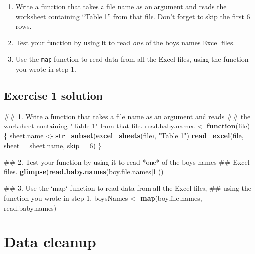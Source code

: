 \documentclass[]{book}
\newenvironment{Shaded}{\begin{snugshade}}{\end{snugshade}}
\newcommand{\KeywordTok}[1]{\textcolor[rgb]{0.13,0.29,0.53}{\textbf{#1}}}
\newcommand{\DataTypeTok}[1]{\textcolor[rgb]{0.13,0.29,0.53}{#1}}
\newcommand{\DecValTok}[1]{\textcolor[rgb]{0.00,0.00,0.81}{#1}}
\newcommand{\StringTok}[1]{\textcolor[rgb]{0.31,0.60,0.02}{#1}}
\newcommand{\ControlFlowTok}[1]{\textcolor[rgb]{0.13,0.29,0.53}{\textbf{#1}}}
\newcommand{\NormalTok}[1]{#1}
\begin{document}
\begin{enumerate}
\def\labelenumi{\arabic{enumi}.}
\item
  Write a function that takes a file name as an argument and reads the
  worksheet containing ``Table 1'' from that file. Don't forget to skip
  the first 6 rows.
\item
  Test your function by using it to read \emph{one} of the boys names
  Excel files.
\item
  Use the \texttt{map} function to read data from all the Excel files,
  using the function you wrote in step 1.
\end{enumerate}

\subsection{Exercise 1 solution}\label{exercise-1-solution-1}

\begin{Shaded}
\begin{Highlighting}[]
\NormalTok{  ## 1. Write a function that takes a file name as an argument and reads}
\NormalTok{  ##    the worksheet containing "Table 1" from that file.}
\NormalTok{  read.baby.names <-}\StringTok{ }\ControlFlowTok{function}\NormalTok{(file) \{}
\NormalTok{      sheet.name <-}\StringTok{ }\KeywordTok{str_subset}\NormalTok{(}\KeywordTok{excel_sheets}\NormalTok{(file), }\StringTok{"Table 1"}\NormalTok{)}
      \KeywordTok{read_excel}\NormalTok{(file, }\DataTypeTok{sheet =}\NormalTok{ sheet.name, }\DataTypeTok{skip =} \DecValTok{6}\NormalTok{)}
\NormalTok{  \}}
  
\NormalTok{  ## 2. Test your function by using it to read *one* of the boys names}
\NormalTok{  ##    Excel files.}
  \KeywordTok{glimpse}\NormalTok{(}\KeywordTok{read.baby.names}\NormalTok{(boy.file.names[}\DecValTok{1}\NormalTok{]))}
     
\NormalTok{  ## 3. Use the `map` function to read data from all the Excel files,}
\NormalTok{  ##    using the function you wrote in step 1.}
\NormalTok{  boysNames <-}\StringTok{ }\KeywordTok{map}\NormalTok{(boy.file.names, read.baby.names)}
\end{Highlighting}
\end{Shaded}

\section{Data cleanup}\label{data-cleanup}
\end{document}
